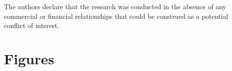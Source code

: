 \documentclass[utf8]{frontiersSCNS}
\begin{document}
The authors declare that the research was conducted in the absence of any commercial or financial relationships that could be construed as a potential conflict of interest.
%
%
%
%




\clearpage
\section*{Figures}
\end{document}
